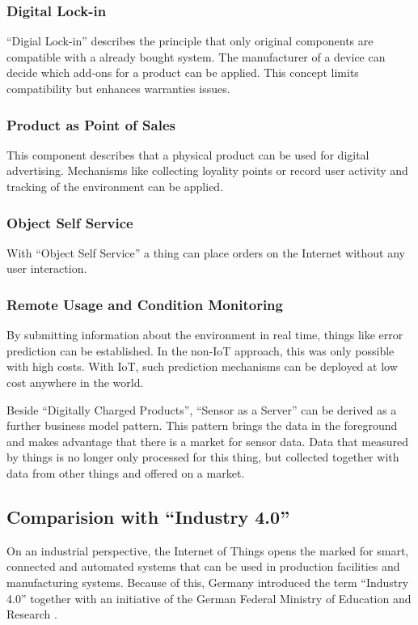 \subsubsection{Digital Lock-in}
``Digial Lock-in'' describes the principle that only original components are compatible with a already bought system. The manufacturer of a device can decide which add-ons for a product can be applied. This concept limits compatibility but enhances warranties issues.

\subsubsection{Product as Point of Sales}
This component describes that a physical product can be used for digital advertising. Mechanisms like collecting loyality points or record user activity and tracking of the environment can be applied.

\subsubsection{Object Self Service}
With ``Object Self Service'' a thing can place orders on the Internet without any user interaction.

\subsubsection{Remote Usage and Condition Monitoring}
By submitting information about the environment in real time, things like error prediction can be established. In the non-IoT approach, this was only possible with high costs. With IoT, such prediction mechanisms can be deployed at low cost anywhere in the world.

Beside ``Digitally Charged Products'', ``Sensor as a Server'' can be derived as a further business model pattern. This pattern brings the data in the foreground and makes advantage that there is a market for sensor data. Data that measured by things is no longer only processed for this thing, but collected together with data from other things and offered on a market.

\subsection{Comparision with ``Industry 4.0''}
On an industrial perspective, the Internet of Things opens the marked for smart, connected and automated systems that can be used in production facilities and manufacturing systems. Because of this, Germany introduced the term ``Industry 4.0'' together with an initiative of the German Federal Ministry of Education and Research \cite{iotfleisch2}.

